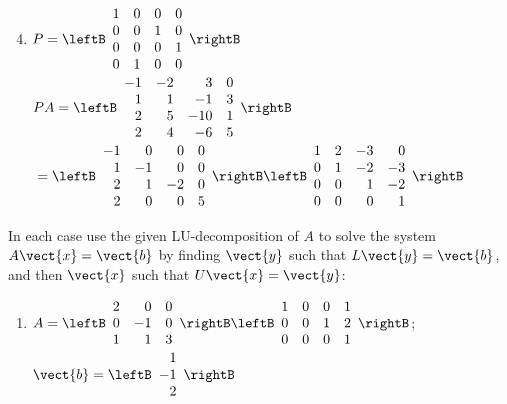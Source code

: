 \begin{multicols}{2}
\begin{ex}
\begin{sol}
\begin{enumerate}[label={\alph*.}]
\setcounter{enumi}{3}
\item $P = \leftB \begin{array}{rrrr}
1 & 0 & 0 & 0 \\
0 & 0 & 1 & 0 \\
0 & 0 & 0 & 1 \\
0 & 1 & 0 & 0
\end{array} \rightB$ \\ $PA = \leftB \begin{array}{rrrr}
-1 & -2 & 3 & 0 \\
1 & 1 & -1 & 3 \\
2 & 5 & -10 & 1 \\
2 & 4 & -6 & 5
\end{array} \rightB$ \\ ${} = \leftB \begin{array}{rrrr}
-1 & 0 & 0 & 0 \\
1 & -1 & 0 & 0 \\
2 & 1 & -2 & 0 \\
2 & 0 & 0 & 5
\end{array} \rightB \leftB \begin{array}{rrrr}
1 & 2 & -3 & 0 \\
0 & 1 & -2 & -3 \\
0 & 0 & 1 & -2 \\
0 & 0 & 0 & 1
\end{array} \rightB$

\end{enumerate}
\end{sol}
\end{ex}

\begin{ex}
In each case use the given LU-decomposition of $A$ to solve the system $A\vect{x} = \vect{b}$ by finding $\vect{y}$ such that $L\vect{y} = \vect{b}$, and then $\vect{x}$ such that $U\vect{x} = \vect{y}$:

\begin{enumerate}[leftmargin=1em,label={\alph*.}]
\item $A = \leftB \begin{array}{rrr}
2 & 0 & 0 \\
0 & -1 & 0 \\
1 & 1 & 3
\end{array} \rightB \leftB \begin{array}{rrrr}
1 & 0 & 0 & 1\\
0 & 0 & 1 & 2 \\
0 & 0 & 0 & 1
\end{array} \rightB$; \\ $\vect{b} = \leftB \begin{array}{r}
1 \\
-1 \\
2
\end{array} \rightB$


\end{enumerate}
\end{ex}
\end{multicols}
